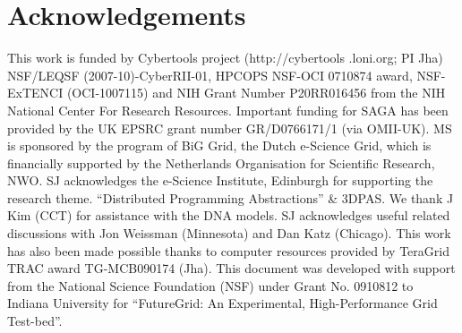 \documentclass[conference,final]{IEEEtran}
\newcommand{\note}[1]{ {\textcolor{magenta} { ***Note: #1 }}}
\newcommand{\note}[1]{}
\newcommand{\up}{\vspace*{-1em}}
\newcommand{\upp}{\vspace*{-0.5em}}
\begin{document}

\up
\section*{Acknowledgements\upp\upp}
\footnotesize{This work is funded by Cybertools project
  (http://cybertools .loni.org; PI Jha) NSF/LEQSF
  (2007-10)-CyberRII-01, HPCOPS NSF-OCI 0710874 award, NSF-ExTENCI
  (OCI-1007115) and NIH Grant Number P20RR016456 from the NIH National
  Center For Research Resources. Important funding for SAGA has been
  provided by the UK EPSRC grant number GR/D0766171/1 (via OMII-UK).
  MS is sponsored by the program of BiG Grid, the Dutch e-Science
  Grid, which is financially supported by the Netherlands Organisation
  for Scientific Research, NWO. SJ acknowledges the e-Science
  Institute, Edinburgh for supporting the research
  theme. ``Distributed Programming Abstractions'' \& 3DPAS. We thank J
  Kim (CCT) for assistance with the DNA models.  SJ acknowledges
  useful related discussions with Jon Weissman (Minnesota) and Dan
  Katz (Chicago). This work has also been made possible thanks to
  computer resources provided by TeraGrid TRAC award TG-MCB090174
  (Jha). This document was developed with support from the National
  Science Foundation (NSF) under Grant No.  0910812 to Indiana
  University for ``FutureGrid: An Experimental, High-Performance Grid
  Test-bed''.}
\up
%


\end{document}
